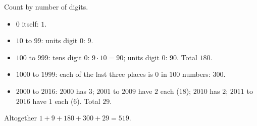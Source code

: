 Count by number of digits.
\begin{itemize}
\item $0$ itself: $1$.
\item $10$ to $99$: units digit $0$: $9$.
\item $100$ to $999$: tens digit $0$: $9\cdot10=90$; units digit $0$: $90$. Total $180$.
\item $1000$ to $1999$: each of the last three places is $0$ in $100$ numbers: $300$.
\item $2000$ to $2016$: $2000$ has $3$; $2001$ to $2009$ have $2$ each ($18$); $2010$ has $2$; $2011$ to $2016$ have $1$ each ($6$). Total $29$.
\end{itemize}
Altogether $1+9+180+300+29=\boxed{519}$.
